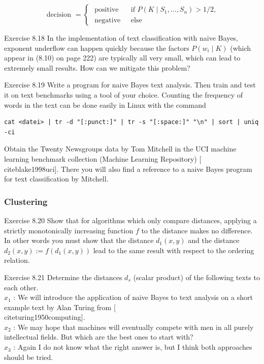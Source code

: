 \documentclass[10pt]{book}
\begin{document}
$$
\text { decision }= \begin{cases}\text { positive } & \text { if } P\left(K \mid S_{1}, \ldots, S_{n}\right)>1 / 2, \\ \text { negative } & \text { else }\end{cases}
$$

Exercise 8.18 In the implementation of text classification with naive Bayes, exponent underflow can happen quickly because the factors $P\left(w_{i} \mid K\right)$ (which appear in (8.10) on page 222) are typically all very small, which can lead to extremely small results. How can we mitigate this problem?

Exercise 8.19 Write a program for naive Bayes text analysis. Then train and test it on text benchmarks using a tool of your choice. Counting the frequency of words in the text can be done easily in Linux with the command

\begin{verbatim}
cat <datei> | tr -d "[:punct:]" | tr -s "[:space:]" "\n" | sort | uniq -ci
\end{verbatim}

Obtain the Twenty Newsgroups data by Tom Mitchell in the UCI machine learning benchmark collection (Machine Learning Repository) [\\cite{blake1998uci}]. There you will also find a reference to a naive Bayes program for text classification by Mitchell.

\subsubsection*{Clustering}
Exercise 8.20 Show that for algorithms which only compare distances, applying a strictly monotonically increasing function $f$ to the distance makes no difference. In other words you must show that the distance $d_{1}(x, y)$ and the distance $d_{2}(x, y):= f\left(d_{1}(x, y)\right)$ lead to the same result with respect to the ordering relation.

Exercise 8.21 Determine the distances $d_{s}$ (scalar product) of the following texts to each other.\\

$x_{1}$ : We will introduce the application of naive Bayes to text analysis on a short example text by Alan Turing from [\\cite{turing1950computing}].\\
$x_{2}$ : We may hope that machines will eventually compete with men in all purely intellectual fields. But which are the best ones to start with?\\
$x_{3}$ : Again I do not know what the right answer is, but I think both approaches should be tried.
\end{document}
